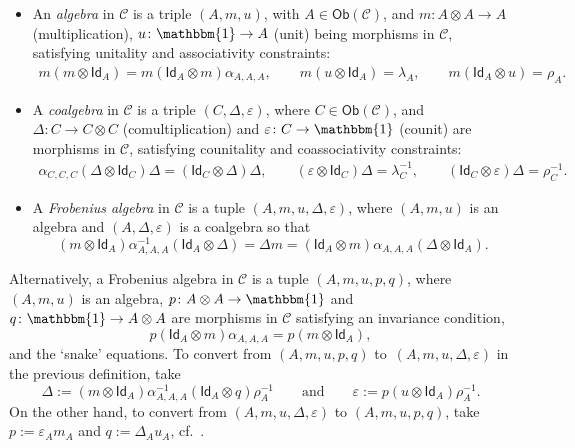 \documentclass[10pt,a4paper]{amsart}
\numberwithin{equation}{section}
\newcommand{\ide}{\mathsf{Id}}
\newcommand{\Ob}{\mathsf{Ob}}
\newcommand{\cC}{\mathcal{C}}
\begin{document}
\begin{Definition} \label{def:co-alg-Frob}\quad
\begin{itemize}\itemsep=0pt
 \item[(a)] An \textit{algebra} in $\cC$ is a triple $( A,m,u)$, with $A \in \Ob (\cC)$, and $m \colon A \otimes A \to A$ (multiplication), $u \colon \mathbbm{1} \to A$ (unit) being morphisms in $\cC$,
 satisfying unitality and associativity constraints:
 \begin{align*}
 m (m \otimes \ide_A) = m(\ide_A \otimes m) \alpha_{A,A,A}, \qquad
 m (u \otimes \ide_A) = \lambda_A, \qquad m(\ide_A \otimes u) = \rho_A.
 \end{align*}

 \item[(b)] A \textit{coalgebra} in $\cC$ is a triple $( C,\Delta,\varepsilon)$, where $C \in \Ob(\cC)$, and $\Delta \colon C \to C \otimes C$ (comultiplication) and $\varepsilon \colon C \to \mathbbm{1}$ (counit) are morphisms in $\cC$,
 satisfying counitality and coassociativity constraints:
 \begin{align*}
 \alpha_{C,C,C}(\Delta \otimes \ide_C) \Delta = (\ide_C \otimes \Delta)\Delta, \qquad
 (\varepsilon \otimes \ide_C)\Delta = \lambda_C^{-1}, \qquad (\ide_C \otimes \varepsilon)\Delta = \rho_C^{-1}.
 \end{align*}

 \item[(c)] A \textit{Frobenius algebra} in $\cC$ is a tuple $ ( A, m, u, \Delta, \varepsilon )$, where
 $( A,m,u)$ is an algebra and $ ( A,\Delta,\varepsilon )$ is a coalgebra so that
 \begin{equation*}
 ( m \otimes \ide_A ) \alpha^{-1}_{A,A,A} ( \ide_A \otimes \Delta )=\Delta m = ( \ide_A \otimes m ) \alpha_{A,A,A} ( \Delta \otimes \ide_A ).
 \end{equation*}
\end{itemize}
\end{Definition}

\begin{Remark} \label{rem:Frobpairing}
 Alternatively, a Frobenius algebra in $\cC$ is a tuple $ ( A,m,u,p,q )$, where $ ( A, m, u )$ is an algebra, $p \colon A \otimes A \to \mathbbm{1}$ and $q \colon \mathbbm{1} \to A \otimes A$ are morphisms in $\cC$ satisfying an invariance condition,
 \[
 p ( \ide_A \otimes m ) \alpha_{A,A,A} = p ( m \otimes \ide_A ),
 \]
 and the `snake' equations.
To convert from $ ( A,m,u,p,q )$ to~$ ( A,m,u,\Delta,\varepsilon )$ in the previous definition, take
\[
\Delta:= ( m \otimes \ide_A )\alpha_{A,A,A}^{-1} (\ide_A \otimes q )\rho_A^{-1} \qquad \text{and} \qquad {\varepsilon:=p (u \otimes \ide_A)\rho_A^{-1}}.
\]
On the other hand, to convert from $( A,m,u,\Delta,\varepsilon )$ to $( A,m,u,p,q)$, take
$p:= \varepsilon_A m_A$ and $q:= \Delta_A u_A$, cf.\ \cite{FS}.
\end{Remark}
\end{document}
